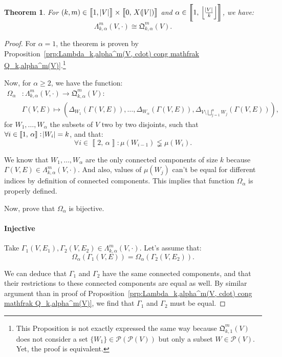 \documentclass{article}
\newtheorem{theorem}[lemma]{Theorem}
\theoremstyle{definition}
\theoremstyle{remark}
\newcommand{\intint}[2]{\left\llbracket#1, \, #2\right\rrbracket}
\newcommand{\floor}[1]{\left\lfloor#1\right\rfloor}
\begin{document}
			\begin{theorem} For $(k, m) \in \intint 1{\abs V} \times \intint 0{X(\abs V)}$ and $\alpha \in \intint 1{\floor {\frac {\abs V}k}}$, we have:
			\[\Lambda_{k,\alpha}^m(V, \cdot) \cong \mathfrak Q_{k,\alpha}^m(V).\]
			\end{theorem}

			\begin{proof} For $\alpha=1$, the theorem is proven by Proposition~\ref{prp:Lambda_k,alpha^m(V, cdot) cong mathfrak Q_k,alpha^m(V)}.\footnote{This Proposition is not exactly
			expressed the same way because $\mathfrak Q_{k,1}^m(V)$ does not consider a set $\{W_1\} \in \mathcal P\left(\mathcal P(V)\right)$ but only a subset $W \in \mathcal P(V)$.
			Yet, the proof is equivalent.}

			Now, for $\alpha \geq 2$, we have the function:
			\begin{align*}
				\Omega_\alpha &: \Lambda_{k,\alpha}^m(V, \cdot) \to \mathfrak Q_{k,\alpha}^m(V) : \\
				&\Gamma(V, E) \mapsto \left(\Delta_{W_1}(\Gamma(V, E)), \ldots, \Delta_{W_\alpha}(\Gamma(V, E)), \Delta_{V \setminus \bigsqcup_{j=1}^\alpha W_j}(\Gamma(V, E))\right),
			\end{align*}
			for $W_1, \ldots, W_\alpha$ the subsets of $V$ two by two disjoints, such that $\forall i \in \intint 1\alpha : \abs {W_i}=k$, and that:
			\[\forall i \in \intint 2\alpha : \mu(W_{i-1}) \lneqq \mu(W_i).\]

			We know that $W_1, \ldots, W_\alpha$ are the only connected components of size $k$ because $\Gamma(V, E) \in \Lambda_{k,\alpha}^m(V, \cdot)$. And also,
			values of $\mu(W_j)$ can't be equal for different indices by definition of connected components. This implies that function $\Omega_\alpha$ is properly
			defined.

			Now, prove that $\Omega_\alpha$ is bijective.

			\paragraph{Injective} Take $\Gamma_1(V, E_1), \Gamma_2(V, E_2) \in \Lambda_{k,\alpha}^m(V, \cdot)$. Let's assume that:
			\[\Omega_\alpha(\Gamma_1(V, E)) = \Omega_\alpha(\Gamma_2(V, E_2)).\]

			We can deduce that $\Gamma_1$ and $\Gamma_2$ have the same connected components, and that their restrictions to these connected components are equal as well.
			By similar argument than in proof of Proposition~\ref{prp:Lambda_k,alpha^m(V, cdot) cong mathfrak Q_k,alpha^m(V)}, we find that $\Gamma_1$ and $\Gamma_2$ must be equal.


\end{proof}
\end{document}
